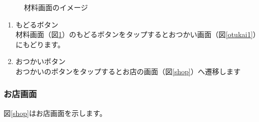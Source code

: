 \documentclass[a4j]{jarticle}
\begin{document}
\begin{figure}[H]
    \begin{center}
    \caption {材料画面のイメージ}
    \label{material}
    \end{center}
\end{figure}

\begin{enumerate}
  \renewcommand{\labelenumi}{\textcircled{\scriptsize \theenumi}}
\item もどるボタン\\
  材料画面（図\ref{material}）のもどるボタンをタップするとおつかい画面（図\ref{otukai1}）にもどります。
\item おつかいボタン\\
 おつかいのボタンをタップするとお店の画面（図\ref{shop}）へ遷移します
\end{enumerate}

\newpage
\subsubsection{お店画面}
図\ref{shop}はお店画面を示します。\\
\end{document}
